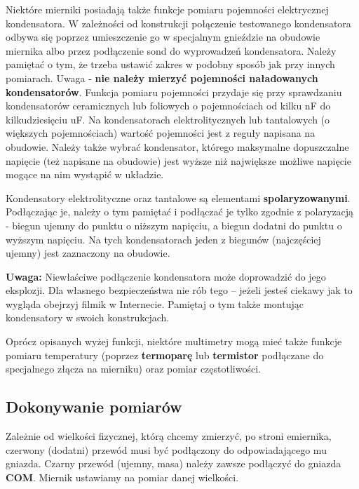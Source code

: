 Niektóre mierniki posiadają także funkcje pomiaru pojemności elektrycznej kondensatora. W zależności od konstrukcji połączenie testowanego
kondensatora odbywa się poprzez umieszczenie go w specjalnym gnieździe na obudowie miernika albo przez podłączenie sond do wyprowadzeń kondensatora. Należy pamiętać
o tym, że trzeba ustawić zakres w podobny sposób jak przy innych pomiarach. Uwaga - \textbf{nie należy mierzyć pojemności naładowanych
  kondensatorów}. Funkcja pomiaru pojemności przydaje się przy sprawdzaniu kondensatorów ceramicznych lub foliowych o pojemnościach od kilku nF do kilkudziesięciu uF. Na kondensatorach elektrolitycznych lub tantalowych (o większych pojemnościach) wartość
pojemności jest z reguły napisana na obudowie. Należy także wybrać kondensator, którego maksymalne dopuszczalne napięcie (też napisane na obudowie)
jest wyższe niż największe możliwe napięcie mogące na nim wystąpić w układzie.

\begin{ProTip}{}
  Kondensatory elektrolityczne oraz tantalowe są elementami \textbf{spolaryzowanymi}. Podłączając je, należy o tym pamiętać i podłączać je
  tylko zgodnie z polaryzacją - biegun ujemny do punktu o niższym napięciu, a biegun dodatni do punktu o wyższym napięciu. Na tych kondensatorach jeden
  z biegunów (najczęściej ujemny) jest zaznaczony na obudowie.
  
  \textbf{Uwaga:} Niewłaściwe podłączenie kondensatora może doprowadzić do jego eksplozji.
  Dla własnego bezpieczeństwa nie rób tego – jeżeli jesteś ciekawy jak to wygląda obejrzyj filmik w Internecie.
  Pamiętaj o tym także montując kondensatory w swoich konstrukcjach.
\end{ProTip}

Oprócz opisanych wyżej funkcji, niektóre multimetry mogą mieć także funkcje pomiaru temperatury (poprzez \textbf{termoparę}
lub \textbf{termistor} podłączane do
specjalnego złącza na mierniku) oraz pomiar częstotliwości.

\subsection{Dokonywanie pomiarów}

Zależnie od wielkości fizycznej, którą chcemy zmierzyć, po stroni emiernika, czerwony (dodatni) przewód musi być podłączony do odpowiadającego
mu gniazda. Czarny przewód (ujemny, masa) należy zawsze podłączyć do gniazda \textbf{COM}. Miernik ustawiamy na pomiar danej
wielkości.
\\

